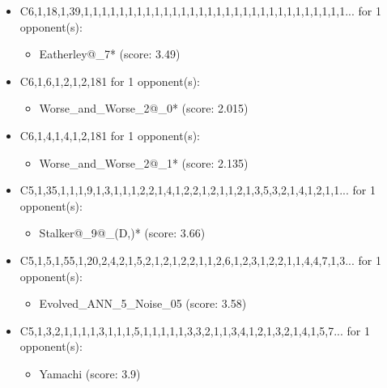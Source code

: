 \begin{appendices}
\begin{itemize}
    \item C6,1,18,1,39,1,1,1,1,1,1,1,1,1,1,1,1,1,1,1,1,1,1,1,1,1,1,1,1,1,1,1,1,1,1... for 1 opponent(s):
    \begin{multicols}{3}
         \begin{itemize}
            \item Eatherley@\_7* (score: 3.49)
        \end{itemize}
     \end{multicols}
     
    \item C6,1,6,1,2,1,2,181 for 1 opponent(s):
    \begin{multicols}{3}
         \begin{itemize}
            \item Worse\_and\_Worse\_2@\_0* (score: 2.015)
        \end{itemize}
     \end{multicols}
     
    \item C6,1,4,1,4,1,2,181 for 1 opponent(s):
    \begin{multicols}{3}
         \begin{itemize}
            \item Worse\_and\_Worse\_2@\_1* (score: 2.135)
        \end{itemize}
     \end{multicols}
     
    \item C5,1,35,1,1,1,9,1,3,1,1,1,2,2,1,4,1,2,2,1,2,1,1,2,1,3,5,3,2,1,4,1,2,1,1... for 1 opponent(s):
    \begin{multicols}{3}
         \begin{itemize}
            \item Stalker@\_9@\_(D,)* (score: 3.66)
        \end{itemize}
     \end{multicols}
     
    \item C5,1,5,1,55,1,20,2,4,2,1,5,2,1,2,1,2,2,1,1,2,6,1,2,3,1,2,2,1,1,4,4,7,1,3... for 1 opponent(s):
    \begin{multicols}{3}
         \begin{itemize}
            \item Evolved\_ANN\_5\_Noise\_05 (score: 3.58)
        \end{itemize}
     \end{multicols}
     
    \item C5,1,3,2,1,1,1,1,3,1,1,1,5,1,1,1,1,1,3,3,2,1,1,3,4,1,2,1,3,2,1,4,1,5,7... for 1 opponent(s):
    \begin{multicols}{3}
         \begin{itemize}
            \item Yamachi (score: 3.9)
        \end{itemize}
     \end{multicols}
     

\end{itemize}
\end{appendices}
